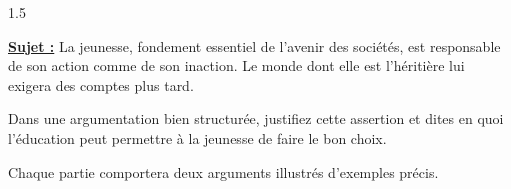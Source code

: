 \documentclass[12pt]{article}
\begin{document}
\begin{spacing}{1.5}

\textbf{\underline{Sujet :}} \quad La jeunesse, fondement essentiel de l'avenir des sociétés, est responsable de son action comme de son inaction. Le monde dont elle est l'héritière lui exigera des comptes plus tard.

\quad Dans une argumentation bien structurée, justifiez cette assertion et dites en quoi l'éducation peut permettre à la jeunesse de faire le bon choix.

\quad Chaque partie comportera deux arguments illustrés d'exemples précis.


\quad
\quad

\end{spacing}
\end{document}
